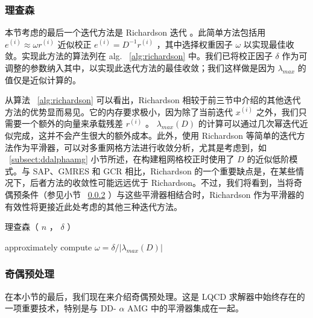 \documentclass[5p,times,a4paper,fleqn]{cas-dc}
\begin{document}
   \subsubsection{理查森  }     

本节考虑的最后一个迭代方法是 Richardson 迭代    \cite{richardson1911ix}    。此简单方法包括用    $e^{(i)} \approx \omega r^{(i)}$    近似校正    $e^{(i)} = D^{-1}r^{(i)}$    ，其中选择权重因子    $\omega$    以实现最佳收敛。实现此方法的算法列在 alg. \     \ref{alg:richardson}    中。我们已将校正因子    $\delta$    作为可调整的参数纳入其中，以实现此迭代方法的最佳收敛；我们这样做是因为    $\lambda_{max}$    的值仅是近似计算的。  

从算法 \     \ref{alg:richardson}    可以看出，Richardson 相较于前三节中介绍的其他迭代方法的优势显而易见。它的内存要求极小，因为除了当前迭代    $x^{(i)}$    之外，我们只需要一个额外的向量来承载残差    $r^{(i)}$    。   $\lambda_{max}(D)$    的计算可以通过几次幂迭代近似完成，这并不会产生很大的额外成本。此外，使用 Richardson 等简单的迭代方法作为平滑器，可以对多重网格方法进行收敛分析，尤其是考虑到，如 \     \ref{subsect:ddalphaamg}    小节所述，在构建粗网格校正时使用了    $D$    的近似低阶模式。与 SAP、GMRES 和 GCR 相比，Richardson 的一个重要缺点是，在某些情况下，后者方法的收敛性可能远远优于 Richardson。不过，我们将看到，当将奇偶预条件（参见小节 \     \ref{subsubsect:oddeven_prec}   ）与这些平滑器相结合时，Richardson 作为平滑器的有效性将更接近此处考虑的其他三种迭代方法。  

   \begin{algorithm}
\caption{理查森（   $n$   ，   $\delta$   ）  } \label{alg:richardson}
\KwOut{}
approximately compute         $\omega = \delta / |\lambda_{max}(D)|$         \\ 
\end{algorithm}     

   \subsubsection{奇偶预处理  }       \label{subsubsect:oddeven_prec}     

在本小节的最后，我们现在来介绍奇偶预处理。这是 LQCD 求解器中始终存在的一项重要技术，特别是与 DD-   $\alpha$    AMG 中的平滑器集成在一起。  
\end{document}
